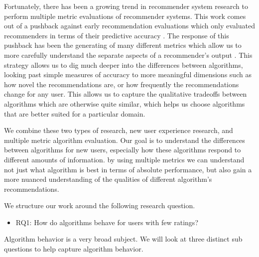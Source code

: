 \documentclass[letterpaper]{sig-alternate}
\begin{document}
  Fortunately, there has been a growing trend in recommender system research to perform multiple metric evaluations of recommender systems.
  This work comes out of a pushback against early recommendation evaluations which only evaluated recommenders in terms of their predictive accuracy \cite{accurateIsNotEnough}.
  The response of this pushback has been the generating of many different metrics which allow us to more carefully understand the separate aspects of a recommender's output \cite{LathiaTemporal, CremonesiTopN, zieglerDiversity}.
  This strategy allows us to dig much deeper into the differences between algorithms, looking past simple measures of accuracy to more meaningful dimensions such as how novel the recommendations are, or how frequently the recommendations change for any user.
  This allows us to capture the qualitative tradeoffs between algorithms which are otherwise quite similar, which helps us choose algorithms that are better suited for a particular domain.

  We combine these two types of research, new user experience research, and multiple metric algorithm evaluation.
  Our goal is to understand the differences between algorithms for new users, especially how these algorithms respond to different amounts of information.
  by using multiple metrics we can understand not just what algorithm is best in terms of absolute performance, but also gain a more nuanced understanding of the qualities of different algorithm's recommendations.

  We structure our work around the following research question.
  \begin{itemize}
    \item RQ1: How do algorithms behave for users with few ratings?
  \end{itemize}
  Algorithm behavior is a very broad subject.
  We will look at three distinct sub questions to help capture algorithm behavior.

      
\end{document}
